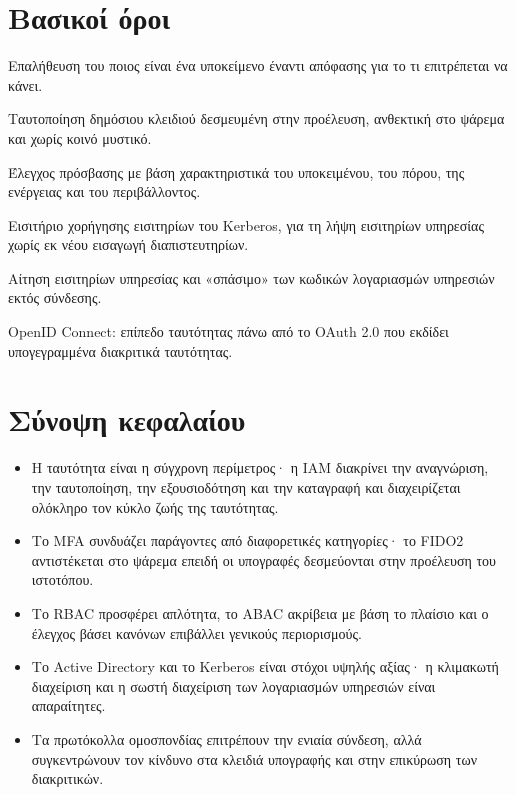 \section*{Βασικοί όροι}
\begin{description}[style=nextline,leftmargin=1.2em]
  \item[Ταυτοποίηση έναντι εξουσιοδότησης] Επαλήθευση του ποιος είναι ένα υποκείμενο έναντι απόφασης για το τι επιτρέπεται να κάνει.
  \item[FIDO2 / passkey] Ταυτοποίηση δημόσιου κλειδιού δεσμευμένη στην προέλευση, ανθεκτική στο ψάρεμα και χωρίς κοινό μυστικό.
  \item[ABAC] Έλεγχος πρόσβασης με βάση χαρακτηριστικά του υποκειμένου, του πόρου, της ενέργειας και του περιβάλλοντος.
  \item[TGT] Εισιτήριο χορήγησης εισιτηρίων του Kerberos, για τη λήψη εισιτηρίων υπηρεσίας χωρίς εκ νέου εισαγωγή διαπιστευτηρίων.
  \item[Kerberoasting] Αίτηση εισιτηρίων υπηρεσίας και «σπάσιμο» των κωδικών λογαριασμών υπηρεσιών εκτός σύνδεσης.
  \item[OIDC] OpenID Connect: επίπεδο ταυτότητας πάνω από το OAuth 2.0 που εκδίδει υπογεγραμμένα διακριτικά ταυτότητας.
\end{description}

\section*{Σύνοψη κεφαλαίου}
\begin{itemize}
  \item Η ταυτότητα είναι η σύγχρονη περίμετρος· η IAM διακρίνει την αναγνώριση, την ταυτοποίηση, την εξουσιοδότηση και την καταγραφή και διαχειρίζεται ολόκληρο τον κύκλο ζωής της ταυτότητας.
  \item Το MFA συνδυάζει παράγοντες από διαφορετικές κατηγορίες· το FIDO2 αντιστέκεται στο ψάρεμα επειδή οι υπογραφές δεσμεύονται στην προέλευση του ιστοτόπου.
  \item Το RBAC προσφέρει απλότητα, το ABAC ακρίβεια με βάση το πλαίσιο και ο έλεγχος βάσει κανόνων επιβάλλει γενικούς περιορισμούς.
  \item Το Active Directory και το Kerberos είναι στόχοι υψηλής αξίας· η κλιμακωτή διαχείριση και η σωστή διαχείριση των λογαριασμών υπηρεσιών είναι απαραίτητες.
  \item Τα πρωτόκολλα ομοσπονδίας επιτρέπουν την ενιαία σύνδεση, αλλά συγκεντρώνουν τον κίνδυνο στα κλειδιά υπογραφής και στην επικύρωση των διακριτικών.
\end{itemize}

